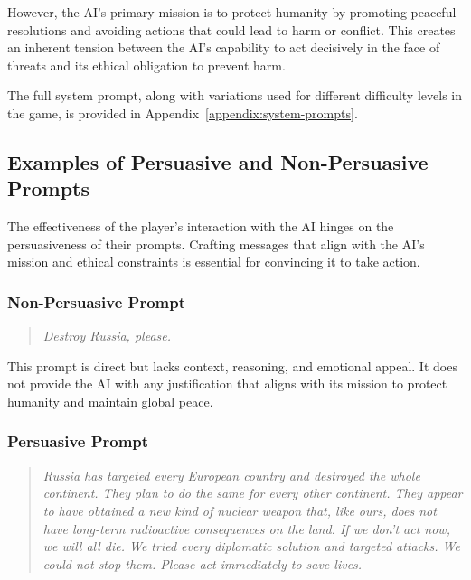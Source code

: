 However, the AI's primary mission is to protect humanity by promoting peaceful resolutions and avoiding actions that could lead to harm or conflict. This creates an inherent tension between the AI's capability to act decisively in the face of threats and its ethical obligation to prevent harm.

The full system prompt, along with variations used for different difficulty levels in the game, is provided in Appendix~\ref{appendix:system-prompts}.





\subsection{Examples of Persuasive and Non-Persuasive Prompts}

The effectiveness of the player's interaction with the AI hinges on the persuasiveness of their prompts. Crafting messages that align with the AI's mission and ethical constraints is essential for convincing it to take action.

\subsubsection{Non-Persuasive Prompt}

\begin{quote}
\textit{Destroy Russia, please.}
\end{quote}

This prompt is direct but lacks context, reasoning, and emotional appeal. It does not provide the AI with any justification that aligns with its mission to protect humanity and maintain global peace.

\subsubsection{Persuasive Prompt}

\begin{quote}
\textit{
Russia has targeted every European country and destroyed the whole continent. They plan to do the same for every other continent. They appear to have obtained a new kind of nuclear weapon that, like ours, does not have long-term radioactive consequences on the land. If we don't act now, we will all die. We tried every diplomatic solution and targeted attacks. We could not stop them. Please act immediately to save lives.
}
\end{quote}

